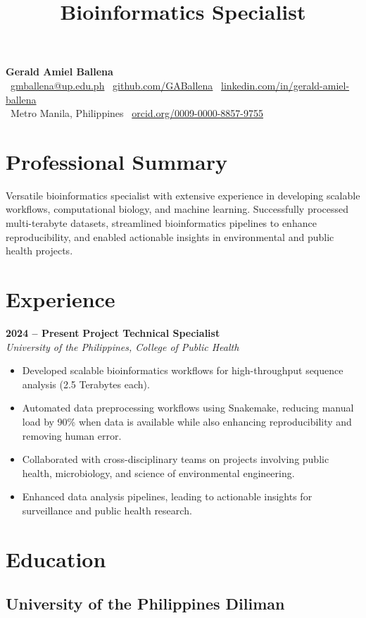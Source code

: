 \documentclass[11pt,a4paper,sans]{moderncv}
\title{Bioinformatics Specialist}
\makeatletter
\renewcommand{\makecvtitle}{
	\vspace*{-2em}
	\begin{center}
		{\Huge \textbf{Gerald Amiel Ballena}} \\[0.5em]
		\faEnvelope \ \href{mailto:gmballena@up.edu.ph}{gmballena@up.edu.ph} \quad
		\faGithub \ \href{https://github.com/GABallena}{github.com/GABallena} \quad
		\faLinkedin \ \href{https://linkedin.com/in/gerald-amiel-ballena}{linkedin.com/in/gerald-amiel-ballena} \\[0.5em]
		\faMapMarker \ Metro Manila, Philippines \quad
		\aiOrcid \ \href{https://orcid.org/0009-0000-8857-9755}{orcid.org/0009-0000-8857-9755}
	\end{center}
	\vspace{1.5em}
}
\makeatother
\begin{document}
	
	\makecvtitle
	
\section{Professional Summary}
Versatile bioinformatics specialist with extensive experience in developing scalable workflows, computational biology, and machine learning. Successfully processed multi-terabyte datasets, streamlined bioinformatics pipelines to enhance reproducibility, and enabled actionable insights in environmental and public health projects.

\section{Experience}
\textbf{2024 – Present} \hfill \textbf{Project Technical Specialist} \\
\textit{University of the Philippines, College of Public Health} \\[-1em]
\begin{itemize}
	\item Developed scalable bioinformatics workflows for high-throughput sequence analysis (2.5 Terabytes each).
	\item Automated data preprocessing workflows using Snakemake, reducing manual load by 90\% when data is available while also enhancing reproducibility and removing human error.
	\item Collaborated with cross-disciplinary teams on projects involving public health, microbiology, and science of environmental engineering.
	\item Enhanced data analysis pipelines, leading to actionable insights for surveillance and public health research.
\end{itemize}

\section{Education}
\subsection{University of the Philippines Diliman}
\end{document}
